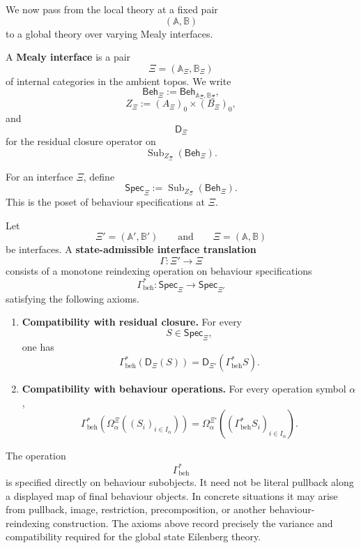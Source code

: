 We now pass from the local theory at a fixed pair
\[
(\mathbb A,\mathbb B)
\]
to a global theory over varying Mealy interfaces.

\begin{definition}
\label{def:state-eilenberg-mealy-interface}
A \textbf{Mealy interface} is a pair
\[
\Xi=(\mathbb A_\Xi,\mathbb B_\Xi)
\]
of internal categories in the ambient topos. We write
\[
\mathsf{Beh}_\Xi
:=
\mathsf{Beh}_{\mathbb A_\Xi,\mathbb B_\Xi},
\]
\[
Z_\Xi:=
(A_\Xi)_0\times(B_\Xi)_0,
\]
and
\[
\mathsf D_\Xi
\]
for the residual closure operator on
\[
\operatorname{Sub}_{Z_\Xi}(\mathsf{Beh}_\Xi).
\]
\end{definition}

\begin{definition}
\label{def:state-eilenberg-specification-poset-interface}
For an interface \(\Xi\), define
\[
\mathsf{Spec}_\Xi
:=
\operatorname{Sub}_{Z_\Xi}(\mathsf{Beh}_\Xi).
\]
This is the poset of behaviour specifications at \(\Xi\).
\end{definition}

\begin{definition}
\label{def:state-eilenberg-state-admissible-interface-translation}
Let
\[
\Xi'=(\mathbb A',\mathbb B')
\qquad\text{and}\qquad
\Xi=(\mathbb A,\mathbb B)
\]
be interfaces. A \textbf{state-admissible interface translation}
\[
\Gamma:\Xi'\to\Xi
\]
consists of a monotone reindexing operation on behaviour specifications
\[
\Gamma_{\mathrm{beh}}^\ast:
\mathsf{Spec}_{\Xi}
\to
\mathsf{Spec}_{\Xi'}
\]
satisfying the following axioms.

\begin{enumerate}
\item \textbf{Compatibility with residual closure.} For every
\[
S\in\mathsf{Spec}_{\Xi},
\]
one has
\[
\Gamma_{\mathrm{beh}}^\ast(\mathsf D_\Xi(S))
=
\mathsf D_{\Xi'}(\Gamma_{\mathrm{beh}}^\ast S).
\]

\item \textbf{Compatibility with behaviour operations.} For every operation
symbol \(\alpha\),
\[
\Gamma_{\mathrm{beh}}^\ast
\left(
\Omega_\alpha^\Xi((S_i)_{i\in I_\alpha})
\right)
=
\Omega_\alpha^{\Xi'}
\left(
(\Gamma_{\mathrm{beh}}^\ast S_i)_{i\in I_\alpha}
\right).
\]
\end{enumerate}
\end{definition}

\begin{remark}[Variance]
\label{rem:state-eilenberg-admissible-translation-variance}
The operation
\[
\Gamma_{\mathrm{beh}}^\ast
\]
is specified directly on behaviour subobjects. It need not be literal
pullback along a displayed map of final behaviour objects. In concrete
situations it may arise from pullback, image, restriction, precomposition, or
another behaviour-reindexing construction. The axioms above record precisely
the variance and compatibility required for the global state Eilenberg
theory.
\end{remark}

